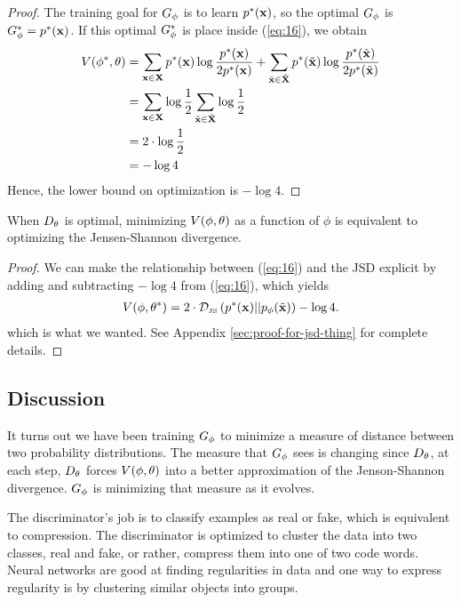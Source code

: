 \begin{proof}
  The training goal for $G_\phi$ is to learn $p^*(\mathbf{x})$, so the optimal $G_\phi$ is $G_\phi^* =
  p^*(\mathbf{x})$. If this optimal $G_\phi^*$ is place inside (\ref{eq:16}), we obtain
  \begin{align}
    \label{eq:side-note}
    V(\phi^*, \theta) & = \sum_{\mathbf{x} \in \mathbf{X}}p^*(\mathbf{x}) \log{ p^*(\mathbf{x})\over 2 p^*(\mathbf{x})} + \sum_{\tilde{\mathbf{x}} \in \tilde{\mathbf{X}}}p^*(\tilde{\mathbf{x}}) \log{ p^*(\tilde{\mathbf{x}}) \over 2 p^*(\tilde{\mathbf{x}})} \\
                      & = \sum_{\mathbf{x} \in \mathbf{X}} \log {1 \over 2} \sum_{\tilde{\mathbf{x}} \in \tilde{\mathbf{X}}} \log {1 \over 2} \\
                      & = 2 \cdot \log{1 \over 2} \\
                      & = -\log{4}
  \end{align}
  Hence, the lower bound on optimization is $-\log{4}$.
\end{proof}

\begin{theorem}
  When $D_\theta$ is optimal, minimizing $V(\phi, \theta)$ as a function of $\phi$ is equivalent to
  optimizing the Jensen-Shannon divergence.
\end{theorem}

\begin{proof}
  We can make the relationship between (\ref{eq:16}) and the JSD explicit by
  adding and subtracting $-\log{4}$ from (\ref{eq:16}), which yields
  \begin{align}
    \label{eq:desired}
    V(\phi, \theta^*) = 2 \cdot \mathcal{D}_{\text{\tiny JS}}\left(p^*(\mathbf{x})\middle|\middle|p_{\phi}(\tilde{\mathbf{x}})\right) - \log{4}.
  \end{align}
  which is what we wanted. See Appendix \ref{sec:proof-for-jsd-thing} for
  complete details.
\end{proof}

\subsection{Discussion}

It turns out we have been training $G_\phi$ to minimize a measure of
distance between two probability distributions. The measure that $G_\phi$
sees is changing since $D_\theta$, at each step, $D_\theta$ forces $V(\phi, \theta)$ into a
better approximation of the Jenson-Shannon divergence.  $G_\phi$ is
minimizing that measure as it evolves.

The discriminator's job is to classify examples as real or fake, which
is equivalent to compression. The discriminator is optimized to
cluster the data into two classes, real and fake, or rather, compress
them into one of two code words. Neural networks are good at finding
regularities in data and one way to express regularity is by
clustering similar objects into groups.

